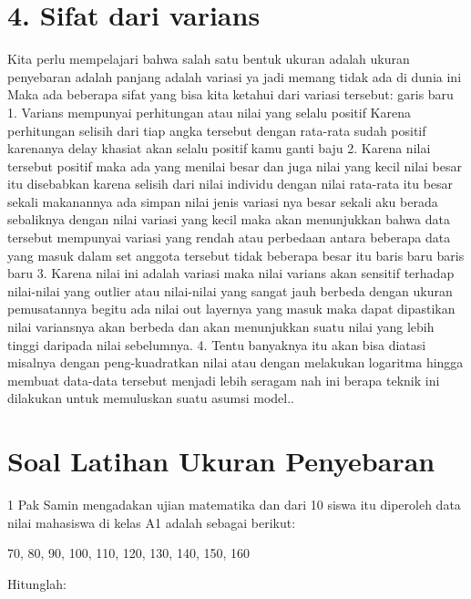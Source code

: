 \documentclass[
]{book}
\theoremstyle{definition}
\theoremstyle{definition}
\theoremstyle{definition}
\theoremstyle{definition}
\theoremstyle{remark}
\begin{document}
\hypertarget{sifat-dari-varians}{%
\section*{4. Sifat dari varians}\label{sifat-dari-varians}}

Kita perlu mempelajari bahwa salah satu bentuk ukuran adalah ukuran penyebaran adalah panjang adalah variasi ya jadi memang tidak ada di dunia ini Maka ada beberapa sifat yang bisa kita ketahui dari variasi tersebut: garis baru
1. Varians mempunyai perhitungan atau nilai yang selalu positif Karena perhitungan selisih dari tiap angka tersebut dengan rata-rata sudah positif karenanya delay khasiat akan selalu positif kamu ganti baju
2. Karena nilai tersebut positif maka ada yang menilai besar dan juga nilai yang kecil nilai besar itu disebabkan karena selisih dari nilai individu dengan nilai rata-rata itu besar sekali makanannya ada simpan nilai jenis variasi nya besar sekali aku berada sebaliknya dengan nilai variasi yang kecil maka akan menunjukkan bahwa data tersebut mempunyai variasi yang rendah atau perbedaan antara beberapa data yang masuk dalam set anggota tersebut tidak beberapa besar itu baris baru baris baru
3. Karena nilai ini adalah variasi maka nilai varians akan sensitif terhadap nilai-nilai yang outlier atau nilai-nilai yang sangat jauh berbeda dengan ukuran pemusatannya begitu ada nilai out layernya yang masuk maka dapat dipastikan nilai variansnya akan berbeda dan akan menunjukkan suatu nilai yang lebih tinggi daripada nilai sebelumnya.
4. Tentu banyaknya itu akan bisa diatasi misalnya dengan peng-kuadratkan nilai atau dengan melakukan logaritma hingga membuat data-data tersebut menjadi lebih seragam nah ini berapa teknik ini dilakukan untuk memuluskan suatu asumsi model..

\hypertarget{soal-latihan-ukuran-penyebaran}{%
\section*{Soal Latihan Ukuran Penyebaran}\label{soal-latihan-ukuran-penyebaran}}

1 Pak Samin mengadakan ujian matematika dan dari 10 siswa itu diperoleh data nilai mahasiswa di kelas A1 adalah sebagai berikut:

70, 80, 90, 100, 110, 120, 130, 140, 150, 160

Hitunglah:
\end{document}
